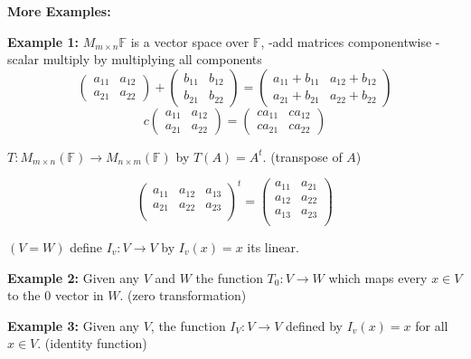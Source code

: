 \documentclass[12pt]{article}
\theoremstyle{plain}
\newcommand{\mF}{{\mathbb{F}}}
\begin{document}
		{\color{Brown}
			\textbf{More Examples: }

			\textbf{Example 1:}
			$M_{m\times n} \mF$ is a vector space over $\mF$, 
			-add matrices componentwise
			-scalar multiply by multiplying all components
			\[
				\begin{pmatrix}
					a_{11} & a_{12} \\ 
					a_{21} & a_{22}
				\end{pmatrix}
				+
				\begin{pmatrix}
					b_{11} & b_{12} \\
					b_{21} & b_{22}
				\end{pmatrix}
				= 
				\begin{pmatrix}
					a_{11} + b_{11} & a_{12} + b_{12}\\
					a_{21} + b_{21} & a_{22} + b_{22}
				\end{pmatrix}
			\]
			\[
				c \begin{pmatrix}
					a_{11} & a_{12} \\
					a_{21} & a_{22}
				\end{pmatrix}
				 = \begin{pmatrix}
				 	 ca_{11} & ca_{12}\\
				 	 ca_{21} & ca_{22}
				 \end{pmatrix}
			\]

			$T:M_{m\times n} (\mF) \to M_{n\times m} (\mF)$ by $T(A) = A^t$.
			(transpose of $A$)

			\[
				\begin{pmatrix}
					a_{11} & a_{12} & a_{13}\\
					a_{21} & a_{22} & a_{23}\\
				\end{pmatrix}^t
				=
				\begin{pmatrix}
					a_{11} & a_{21}\\
					a_{12} & a_{22}\\
					a_{13} & a_{23}\\
				\end{pmatrix}
			\]

			$(V=W)$ define $I_v : V\to V$ by $I_v(x) = x$ its linear.
		
		\textbf{Example 2:}
		Given any $V$ and $W$ the function $T_0 : V\to W$ which maps every 
		$x \in V$ to the $0$ vector in $W$. (zero transformation)

		\textbf{Example 3:}
		Given any $V$, the function $I_V : V \to V$ defined by $I_v (x) = x$
		for all $x \in V$. (identity function)
		}
\end{document}
